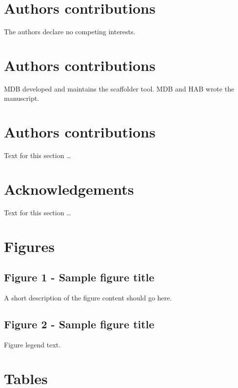 \documentclass[10pt]{bmc_article}
\newenvironment{bmcformat}{\begin{raggedright}\baselineskip20pt\sloppy\setboolean{publ}{false}}{\end{raggedright}\baselineskip20pt\sloppy}
\begin{document}
\begin{bmcformat}
\section*{Authors contributions}
  The authors declare no competing interests.
\section*{Authors contributions}

MDB developed and maintains the scaffolder tool. MDB and HAB wrote the
manuscript.

\section*{Authors contributions}
    Text for this section \ldots
\section*{Acknowledgements}
  Text for this section \ldots
{
   }     %

\section*{Figures}
  \subsection*{Figure 1 - Sample figure title}
      A short description of the figure content
      should go here.

  \subsection*{Figure 2 - Sample figure title}
      Figure legend text.
\section*{Tables}

\end{bmcformat}
\end{document}
